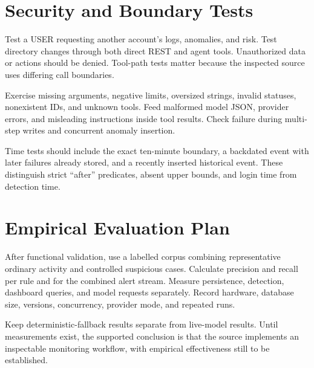 \section{Security and Boundary Tests}
Test a USER requesting another account's logs, anomalies, and risk. Test directory changes through both direct REST and agent tools. Unauthorized data or actions should be denied. Tool-path tests matter because the inspected source uses differing call boundaries.

Exercise missing arguments, negative limits, oversized strings, invalid statuses, nonexistent IDs, and unknown tools. Feed malformed model JSON, provider errors, and misleading instructions inside tool results. Check failure during multi-step writes and concurrent anomaly insertion.

Time tests should include the exact ten-minute boundary, a backdated event with later failures already stored, and a recently inserted historical event. These distinguish strict ``after'' predicates, absent upper bounds, and login time from detection time.

\section{Empirical Evaluation Plan}
After functional validation, use a labelled corpus combining representative ordinary activity and controlled suspicious cases. Calculate precision and recall per rule and for the combined alert stream. Measure persistence, detection, dashboard queries, and model requests separately. Record hardware, database size, versions, concurrency, provider mode, and repeated runs.

Keep deterministic-fallback results separate from live-model results. Until measurements exist, the supported conclusion is that the source implements an inspectable monitoring workflow, with empirical effectiveness still to be established.
